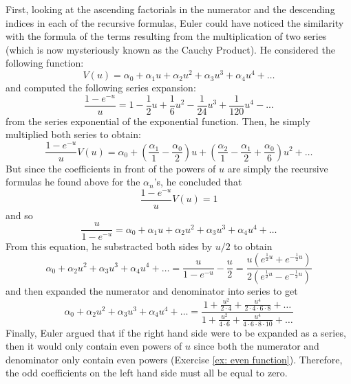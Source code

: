 First, looking at the ascending factorials in the numerator and the descending indices in each of the recursive formulas, Euler could have noticed the similarity with the formula of the terms resulting from the multiplication of two series (which is now mysteriously known as the Cauchy Product). He considered the following function:
\begin{equation}
    V(u) = \alpha_0 + \alpha_1u + \alpha_2 u^2 + \alpha_3u^3 + \alpha_4 u^4 + \dots 
\end{equation}
and computed the following series expansion: 
\begin{equation}
    \frac{1 - e^{-u}}{u} = 1 - \frac{1}{2}u + \frac{1}{6}u^2 - \frac{1}{24}u^3 + \frac{1}{120}u^4 - ...
\end{equation}
from the series exponential of the exponential function. Then, he simply multiplied both series to obtain:
$$\frac{1 - e^{-u}}{u}V(u) = \alpha_0 + \left(\frac{\alpha_1}{1} - \frac{\alpha_0}{2}\right)u + \left(\frac{\alpha_2}{1} - \frac{\alpha_1}{2} + \frac{\alpha_0}{6}\right)u^2 + \dots$$
But since the coefficients in front of the powers of $u$ are simply the recursive formulas he found above for the $\alpha_n$'s, he concluded that
$$\frac{1 - e^{-u}}{u}V(u) = 1$$
and so
\begin{equation} \label{exponential alpha}
    \frac{u}{1 - e^{-u}} = \alpha_0 + \alpha_1u + \alpha_2 u^2 + \alpha_3u^3 + \alpha_4 u^4 + \dots 
\end{equation}
From this equation, he substracted both sides by $u/2$ to obtain 
\begin{equation}
    \alpha_0 + \alpha_2 u^2 + \alpha_3u^3 + \alpha_4 u^4 + \dots = \frac{u}{1 - e^{-u}} - \frac{u}{2} = \frac{u(e^{\frac{1}{2}u} + e^{-\frac{1}{2}u})}{2(e^{\frac{1}{2}u} - e^{-\frac{1}{2}u})}
\end{equation}
and then expanded the numerator and denominator into series to get 
\begin{equation} \label{ratio of even functions}
    \alpha_0 + \alpha_2 u^2 + \alpha_3u^3 + \alpha_4 u^4 + \dots = \frac{1 + \frac{u^2}{2\cdot 4} + \frac{u^4}{2\cdot 4 \cdot 6 \cdot 8} + \dots}{1 + \frac{u^2}{4 \cdot 6} + \frac{u^4}{4\cdot 6 \cdot 8 \cdot 10} + \dots}
\end{equation}
Finally, Euler argued that if the right hand side were to be expanded as a series, then it would only contain even powers of $u$ since both the numerator and denominator only contain even powers (Exercise \ref{ex: even function}). Therefore, the odd coefficients on the left hand side must all be equal to zero.

